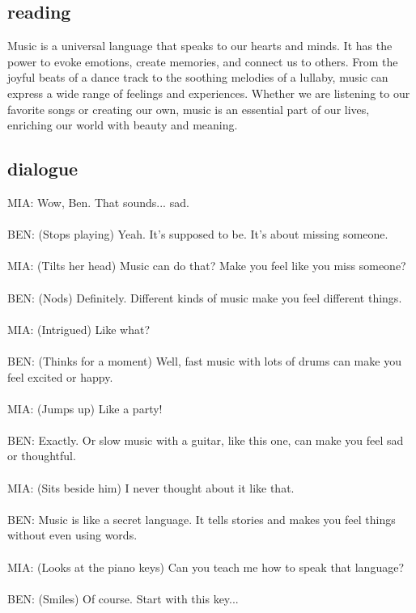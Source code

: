 \documentclass[]{article} %
\begin{document}
\subsection*{reading}
Music is a universal language that speaks to our hearts and minds. It has the power to evoke emotions, create memories, and connect us to others. From the joyful beats of a dance track to the soothing melodies of a lullaby, music can express a wide range of feelings and experiences. Whether we are listening to our favorite songs or creating our own, music is an essential part of our lives, enriching our world with beauty and meaning.



\subsection*{dialogue}


MIA: Wow, Ben. That sounds... sad.\\
\\
BEN: (Stops playing) Yeah. It's supposed to be. It's about missing someone.\\
\\
MIA: (Tilts her head) Music can do that? Make you feel like you miss someone?\\
\\
BEN: (Nods) Definitely. Different kinds of music make you feel different things.\\
\\
MIA: (Intrigued) Like what?\\
\\
BEN: (Thinks for a moment) Well, fast music with lots of drums can make you feel excited or happy.\\
\\
MIA: (Jumps up) Like a party!\\
\\
BEN: Exactly. Or slow music with a guitar, like this one, can make you feel sad or thoughtful.\\
\\
MIA: (Sits beside him) I never thought about it like that.\\
\\
BEN: Music is like a secret language. It tells stories and makes you feel things without even using words.\\
\\
MIA: (Looks at the piano keys) Can you teach me how to speak that language?\\
\\
BEN: (Smiles) Of course. Start with this key...\\
\end{document}
